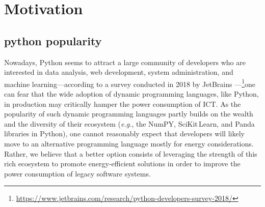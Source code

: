 


\section{Motivation}
\subsection{python popularity}

Nowadays, Python seems to attract a large community of developers who are interested in data analysis, web development, system administration, and machine learning—according to a survey conducted in 2018 by JetBrains ---\footnote{\url{https://www.jetbrains.com/research/python-developers-survey-2018/}}one can fear that the wide adoption of dynamic programming languages, like Python, in production may critically hamper the power consumption of ICT.
As the popularity of such dynamic programming languages partly builds on the wealth and the diversity of their ecosystem (\emph{e.g.}, the NumPY, SciKit\,Learn, and Panda libraries in Python), one cannot reasonably expect that developers will likely move to an alternative programming language mostly for energy considerations.
Rather, we believe that a better option consists of leveraging the strength of this rich ecosystem to promote energy-efficient solutions in order to improve the power consumption of legacy software systems.




